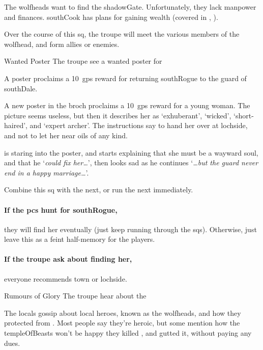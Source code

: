 \label{wolfHeads}

\noindent
The \glspl{wolfhead} want to find the \gls{shadowGate}.
Unfortunately, they lack manpower and finances.
\Gls{southCook} has plans for gaining wealth (covered in , ).

Over the course of this \gls{sq}, the troupe will meet the various members of the \gls{wolfhead}, and form allies or enemies.

{\squash Wanted Poster}%
{The troupe see a wanted poster for }%

A poster proclaims a 10~\glspl{gp} reward for returning \gls{southRogue} to the \gls{guard} of \gls{southDale}.

\begin{boxtext}
  A new poster in the \gls{broch} proclaims a 10~\glspl{gp} reward for a young woman.
  The picture seems useless, but then it describes her as `exhuberant', `wicked', `short-haired', and `expert archer'.
  The instructions say to hand her over at \gls{lochside}, and not to let her near oils of any kind.

   is staring into the poster, and starts explaining that she must be a wayward soul, and that he `\textit{could fix her\ldots}', then looks sad as he continues `\textit{\ldots but the \gls{guard} never end in a happy marriage\ldots}'.
\end{boxtext}

Combine this \gls{sq} with the next, or run the next immediately.

\paragraph{If the \glspl{pc} hunt for \gls{southRogue},}
they will find her eventually (just keep running through the \glspl{sq}).
Otherwise, just leave this as a feint half-memory for the players.

\paragraph{If the troupe ask about finding her,}
everyone recommends \gls{town} or \gls{lochside}.

{\squash Rumours of Glory}%
{The troupe hear about the }%

The locals gossip about local heroes, known as the \glspl{wolfhead}, and how they protected  from .
Most people say they're heroic, but some mention how the \gls{templeOfBeasts} won't be happy they killed , and gutted it, without paying any dues.

